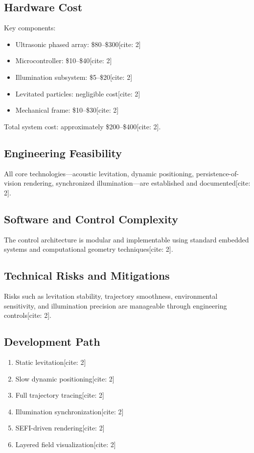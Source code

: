 \documentclass[10pt,twocolumn]{article}
\begin{document}
\subsection{Hardware Cost}
Key components:
\begin{itemize}
    \item Ultrasonic phased array: \$80--\$300[cite: 2]
    \item Microcontroller: \$10--\$40[cite: 2]
    \item Illumination subsystem: \$5--\$20[cite: 2]
    \item Levitated particles: negligible cost[cite: 2]
    \item Mechanical frame: \$10--\$30[cite: 2]
\end{itemize}
Total system cost: approximately \$200--\$400[cite: 2].

\subsection{Engineering Feasibility}
All core technologies—acoustic levitation, dynamic positioning, persistence-of-vision rendering, synchronized illumination—are established and documented[cite: 2].

\subsection{Software and Control Complexity}
The control architecture is modular and implementable using standard embedded systems and computational geometry techniques[cite: 2].

\subsection{Technical Risks and Mitigations}
Risks such as levitation stability, trajectory smoothness, environmental sensitivity, and illumination precision are manageable through engineering controls[cite: 2].

\subsection{Development Path}
\begin{enumerate}
    \item Static levitation[cite: 2]
    \item Slow dynamic positioning[cite: 2]
    \item Full trajectory tracing[cite: 2]
    \item Illumination synchronization[cite: 2]
    \item SEFI-driven rendering[cite: 2]
    \item Layered field visualization[cite: 2]
\end{enumerate}
\end{document}
